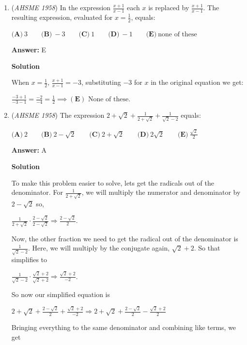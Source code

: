 \begin{enumerate}
 


	\item (\textit{AHSME 1958}) In the expression $\frac{x + 1}{x - 1}$ each $x$ is replaced by $\frac{x + 1}{x - 1}$. The resulting expression, evaluated for $x = \frac{1}{2}$, equals:


 $\textbf{(A)}\ 3\qquad  \textbf{(B)}\ -3\qquad  \textbf{(C)}\ 1\qquad  \textbf{(D)}\ -1\qquad  \textbf{(E)}\ \text{none of these}$

 \textbf{Answer: }E



\textbf{Solution}

When $x=\frac{1}{2}$, $\frac{x+1}{x-1}=-3$, substituting $-3$ for $x$ in the original equation we get:

 $\frac{-3+1}{-3-1}=\frac{-2}{-4}=\frac{1}{2}\implies \boxed{\mathbf{(E)}\text{ None of these}}$.

 


	\item (\textit{AHSME 1958}) The expression $2 + \sqrt{2} + \frac{1}{2 + \sqrt{2}} + \frac{1}{\sqrt{2} - 2}$  equals:


 $\textbf{(A)}\ 2\qquad  \textbf{(B)}\ 2 - \sqrt{2}\qquad  \textbf{(C)}\ 2 + \sqrt{2}\qquad  \textbf{(D)}\ 2\sqrt{2}\qquad  \textbf{(E)}\ \frac{\sqrt{2}}{2}$

 \textbf{Answer: }A



\textbf{Solution}

To make this problem easier to solve, lets get the radicals out of the denominator. For $\frac{1}{2 + \sqrt2}$, we will multiply the numerator and denominator by $2- \sqrt2$ so,

 $\frac{1}{2 + \sqrt2} \cdot \frac{2 - \sqrt2}{2 - \sqrt2} \Rightarrow \frac{2 - \sqrt2}{2}$.

 Now, the other fraction we need to get the radical out of the denominator is $\frac{1}{\sqrt2 - 2}$. Here, we will  multiply by the conjugate again, $\sqrt2 + 2$. So that simplifies to

 $\frac{1}{\sqrt2 - 2} \cdot \frac{\sqrt2 + 2}{\sqrt2 + 2} \Rightarrow \frac{\sqrt2 + 2}{-2}$.

 So now our simplified equation is

 $2 + \sqrt2 + \frac{2- \sqrt2}{2} + \frac{\sqrt2 + 2}{-2} \Rightarrow 2+ \sqrt2 + \frac{2 - \sqrt2}{2} - \frac{\sqrt2 +2}{2}$

 Bringing everything to the same denominator and combining like terms, we get


\end{enumerate}
